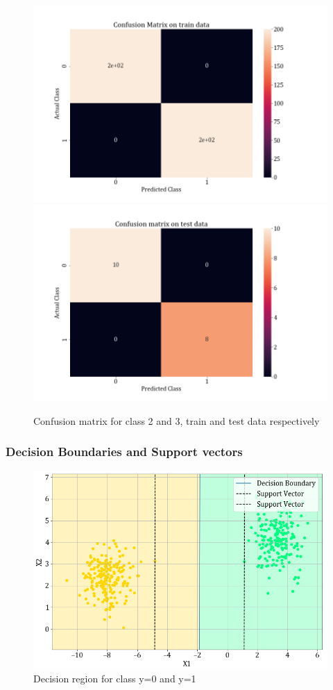 \documentclass[11pt,a4paper]{article}
\newcommand{\noi}{\noindent}
\begin{document}
\begin{figure}[H]
\centering
\includegraphics[scale=0.4]{images/1A_ovo_conf23_train.png}
\includegraphics[scale=0.4]{images/1A_ovo_conf23_test.png}
\caption{Confusion matrix for class 2 and 3, train and test data respectively}
\end{figure}
\noi 

\subsubsection{Decision Boundaries and Support vectors}
\begin{figure}[H]
    \centering
    \includegraphics[scale=0.55]{images/1A_ovo_01.png}
    \caption{Decision region for class y=0 and y=1}
\end{figure}
\end{document}
